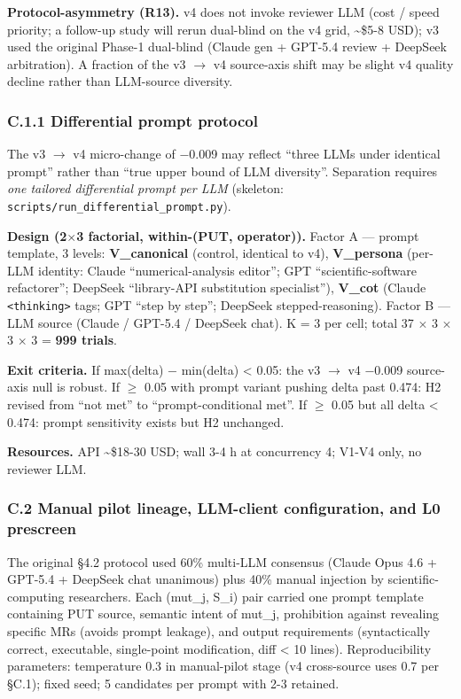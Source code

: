\documentclass[review,12pt,authoryear]{elsarticle}
\begin{document}
\textbf{Protocol-asymmetry (R13).} v4 does not invoke reviewer LLM (cost
/ speed priority; a follow-up study will rerun dual-blind on the v4
grid, \textasciitilde\$5-8 USD); v3 used the original Phase-1 dual-blind
(Claude gen + GPT-5.4 review + DeepSeek arbitration). A fraction of the
v3 $\to$ v4 source-axis shift may be slight v4 quality decline rather than
LLM-source diversity.

\subsubsection{C.1.1 Differential prompt protocol}\label{c.1.1-differential-prompt-protocol-future-work-commitment}

The v3 $\to$ v4 micro-change of −0.009 may reflect ``three LLMs under
identical prompt'' rather than ``true upper bound of LLM diversity''.
Separation requires \emph{one tailored differential prompt per LLM}
(skeleton: \texttt{scripts/run\_differential\_prompt.py}).

\textbf{Design (2$\times$3 factorial, within-(PUT, operator)).} Factor A ---
prompt template, 3 levels: \textbf{V\_canonical} (control, identical to
v4), \textbf{V\_persona} (per-LLM identity: Claude ``numerical-analysis
editor''; GPT ``scientific-software refactorer''; DeepSeek ``library-API
substitution specialist''), \textbf{V\_cot} (Claude
\texttt{\textless{}thinking\textgreater{}} tags; GPT ``step by step'';
DeepSeek stepped-reasoning). Factor B --- LLM source (Claude / GPT-5.4 /
DeepSeek chat). K = 3 per cell; total 37 $\times$ 3 $\times$ 3 $\times$ 3 = \textbf{999
trials}.

\textbf{Exit criteria.} If max(delta) − min(delta) \textless{} 0.05: the
v3 $\to$ v4 −0.009 source-axis null is robust. If $\geq$ 0.05 with prompt variant
pushing delta past 0.474: H2 revised from ``not met'' to
``prompt-conditional met''. If $\geq$ 0.05 but all delta \textless{} 0.474:
prompt sensitivity exists but H2 unchanged.

\textbf{Resources.} API \textasciitilde\$18-30 USD; wall 3-4 h at
concurrency 4; V1-V4 only, no reviewer LLM.

\subsubsection{C.2 Manual pilot lineage, LLM-client configuration, and L0 prescreen}\label{c.2-manual-pilot-lineage-llm-client-configuration-and-l0-prescreen}

The original §4.2 protocol used 60\% multi-LLM consensus (Claude Opus
4.6 + GPT-5.4 + DeepSeek chat unanimous) plus 40\% manual injection by
scientific-computing researchers. Each (mut\_j, S\_i) pair carried one
prompt template containing PUT source, semantic intent of mut\_j,
prohibition against revealing specific MRs (avoids prompt leakage), and
output requirements (syntactically correct, executable, single-point
modification, diff \textless{} 10 lines). Reproducibility parameters:
temperature 0.3 in manual-pilot stage (v4 cross-source uses 0.7 per
§C.1); fixed seed; 5 candidates per prompt with 2-3 retained.
\end{document}

